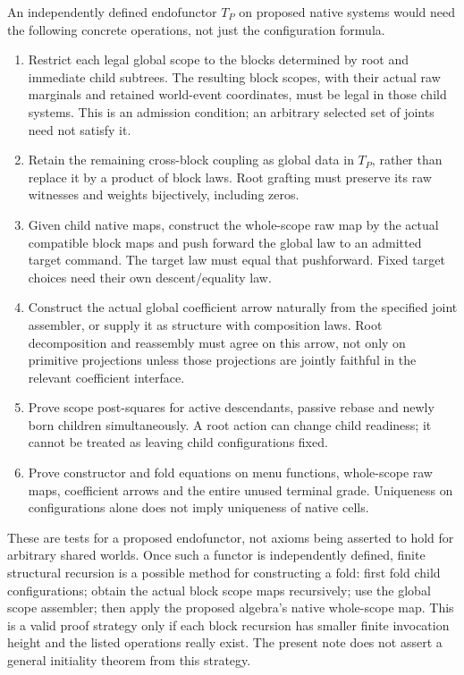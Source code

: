 \documentclass[11pt]{article}
\begin{document}
An independently defined endofunctor $T_P$ on proposed native systems would need the following concrete operations, not just the configuration formula.
\begin{enumerate}
\item Restrict each legal global scope to the blocks determined by root and immediate child subtrees. The resulting block scopes, with their actual raw marginals and retained world-event coordinates, must be legal in those child systems. This is an admission condition; an arbitrary selected set of joints need not satisfy it.
\item Retain the remaining cross-block coupling as global data in $T_P$, rather than replace it by a product of block laws. Root grafting must preserve its raw witnesses and weights bijectively, including zeros.
\item Given child native maps, construct the whole-scope raw map by the actual compatible block maps and push forward the global law to an admitted target command. The target law must equal that pushforward. Fixed target choices need their own descent/equality law.
\item Construct the actual global coefficient arrow naturally from the specified joint assembler, or supply it as structure with composition laws. Root decomposition and reassembly must agree on this arrow, not only on primitive projections unless those projections are jointly faithful in the relevant coefficient interface.
\item Prove scope post-squares for active descendants, passive rebase and newly born children simultaneously. A root action can change child readiness; it cannot be treated as leaving child configurations fixed.
\item Prove constructor and fold equations on menu functions, whole-scope raw maps, coefficient arrows and the entire unused terminal grade. Uniqueness on configurations alone does not imply uniqueness of native cells.
\end{enumerate}

These are tests for a proposed endofunctor, not axioms being asserted to hold for arbitrary shared worlds. Once such a functor is independently defined, finite structural recursion is a possible method for constructing a fold: first fold child configurations; obtain the actual block scope maps recursively; use the global scope assembler; then apply the proposed algebra's native whole-scope map. This is a valid proof strategy only if each block recursion has smaller finite invocation height and the listed operations really exist. The present note does not assert a general initiality theorem from this strategy.
\end{document}
